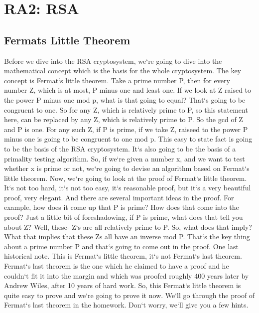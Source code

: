 \section{RA2: RSA}

\subsection{Fermats Little Theorem}
Before we dive into the RSA cryptosystem, we`re going to dive into the mathematical concept which is the basis for the whole cryptosystem.
The key concept is Fermat`s little theorem.
Take a prime number P, then for every number Z, which is at most, P minus one and least one.
If we look at Z raised to the power P minus one mod p, what is that going to equal? That`s going to be congruent to one.
So for any Z, which is relatively prime to P, so this statement here, can be replaced by any Z, which is relatively prime to P\@.
So the gcd of Z and P is one.
For any such Z, if P is prime, if we take Z, raiseed to the power P minus one is going to be congruent to one mod p.
This easy to state fact is going to be the basis of the RSA cryptosystem.
It`s also going to be the basis of a primality testing algorithm.
So, if we`re given a number x, and we want to test whether x is prime or not, we`re going to devise an algorithm based on Fermat`s little theorem.
Now, we`re going to look at the proof of Fermat`s little theorem.
It`s not too hard, it`s not too easy, it`s reasonable proof, but it`s a very beautiful proof, very elegant.
And there are several important ideas in the proof.
For example, how does it come up that P is prime? How does that come into the proof? Just a little bit of foreshadowing, if P is prime, what does that tell you about Z? Well, these- Z`s are all relatively prime to P\@.
So, what does that imply? What that implies that these Zs all have an inverse mod P\@.
That`s the key thing about a prime number P and that`s going to come out in the proof.
One last historical note.
This is Fermat`s little theorem, it`s not Fermat`s last theorem.
Fermat`s last theorem is the one which he claimed to have a proof and he couldn`t fit it into the margin and which was proofed roughly 400 years later by Andrew Wiles, after 10 years of hard work.
So, this Fermat`s little theorem is quite easy to prove and we`re going to prove it now.
We`ll go through the proof of Fermat`s last theorem in the homework.
Don`t worry, we`ll give you a few hints.

